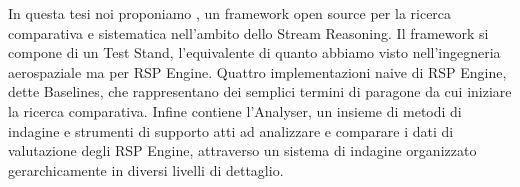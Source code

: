 In questa tesi noi proponiamo \namens, un framework open source per la ricerca comparativa e sistematica nell'ambito dello Stream Reasoning. Il framework si compone di un Test Stand, l'equivalente di quanto abbiamo visto nell'ingegneria aerospaziale ma per RSP Engine. Quattro implementazioni naive di RSP Engine, dette Baselines, che rappresentano dei semplici termini di paragone da cui iniziare la ricerca comparativa. Infine \name contiene l'Analyser, un insieme di metodi di indagine e strumenti di supporto atti ad analizzare e comparare i dati di valutazione degli RSP Engine, attraverso un sistema di indagine organizzato gerarchicamente in diversi livelli di dettaglio.
